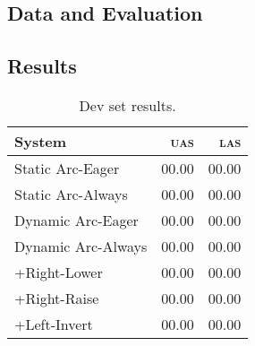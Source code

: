 \documentclass[11pt,letterpaper]{article}
\newcommand{\las}{\textsc{las}\xspace}
\newcommand{\uas}{\textsc{uas}\xspace}
\begin{document}


\subsection{Data and Evaluation}
\clearpage

\subsection{Results}
\label{sec:results}

\begin{table}
    \small
    \centering
    \begin{tabular}{l|rr}
        \hline 
        System             & \uas   & \las  \\
        \hline \hline
        Static Arc-Eager   & 00.00  & 00.00 \\
        Static Arc-Always  & 00.00  & 00.00 \\
        \hline \hline
        Dynamic Arc-Eager  & 00.00  & 00.00 \\
        Dynamic Arc-Always & 00.00  & 00.00 \\
        +Right-Lower       & 00.00  & 00.00 \\
        +Right-Raise       & 00.00  & 00.00 \\
        +Left-Invert       & 00.00  & 00.00 \\
        \hline
    \end{tabular}
    \caption{Dev set results.\label{tab:feats}}
\end{table}
\end{document}
